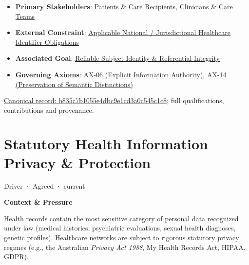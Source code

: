 \begin{itemize}


\item \textbf{Primary Stakeholders}: \href{\detokenize{../../../../../docs/markdown/01-motivation/stakeholders/enterprise-stakeholders.md}}{Patients \& Care Recipients}, \href{\detokenize{../../../../../docs/markdown/01-motivation/stakeholders/enterprise-stakeholders.md}}{Clinicians \& Care Teams}

\item \textbf{External Constraint}: \href{\detokenize{../../../../../docs/markdown/01-motivation/requirements-constraints/external-constraints.md}}{Applicable National / Jurisdictional Healthcare Identifier Obligations}

\item \textbf{Associated Goal}: \href{\detokenize{../../../../../docs/markdown/01-motivation/goals-outcomes/strategic-goals.md}}{Reliable Subject Identity \& Referential Integrity}

\item \textbf{Governing Axioms}: \hyperref[element:952c3b6148ce4fce94b69f99a0c2fec7]{AX-06 (Explicit Information Authority)}, \hyperref[element:d3fc6025dc7646d1b2020b51f7a44bfa]{AX-14 (Preservation of Semantic Distinctions)}

\end{itemize}

{\footnotesize \href{../../../../continuum/motivation/driver/b835c7b1055e4dbc9e1cd3a0c545c1c8.md}{Canonical record: b835c7b1055e4dbc9e1cd3a0c545c1c8}; full qualifications, contributions and provenance.}\par
\section{Statutory Health Information Privacy \& Protection}

\label{element:1dbf34b452b6497f914c704e037aec24}
{\small Driver · Agreed · current}\par

\par\medskip\textbf{Context \& Pressure}\par


Health records contain the most sensitive category of personal data recognized under law (medical histories, psychiatric evaluations, sexual health diagnoses, genetic profiles). Healthcare networks are subject to rigorous statutory privacy regimes (e.g., the Australian \emph{Privacy Act 1988}, My Health Records Act, HIPAA, GDPR).



